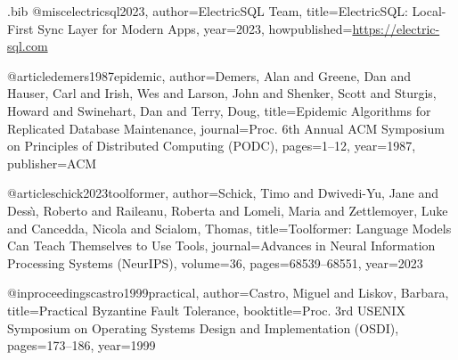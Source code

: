 \begin{filecontents*}{\jobname.bib}
@misc{electricsql2023,
  author={{ElectricSQL Team}},
  title={{ElectricSQL}: Local-First Sync Layer for Modern Apps},
  year={2023},
  howpublished={\url{https://electric-sql.com}}
}

@article{demers1987epidemic,
  author={Demers, Alan and Greene, Dan and Hauser, Carl and Irish, Wes and Larson, John and Shenker, Scott and Sturgis, Howard and Swinehart, Dan and Terry, Doug},
  title={Epidemic Algorithms for Replicated Database Maintenance},
  journal={Proc. 6th Annual ACM Symposium on Principles of Distributed Computing (PODC)},
  pages={1--12},
  year={1987},
  publisher={ACM}
}

@article{schick2023toolformer,
  author={Schick, Timo and Dwivedi-Yu, Jane and Dess\`{\i}, Roberto and Raileanu, Roberta and Lomeli, Maria and Zettlemoyer, Luke and Cancedda, Nicola and Scialom, Thomas},
  title={Toolformer: Language Models Can Teach Themselves to Use Tools},
  journal={Advances in Neural Information Processing Systems (NeurIPS)},
  volume={36},
  pages={68539--68551},
  year={2023}
}

@inproceedings{castro1999practical,
  author={Castro, Miguel and Liskov, Barbara},
  title={Practical {Byzantine} Fault Tolerance},
  booktitle={Proc. 3rd USENIX Symposium on Operating Systems Design and Implementation (OSDI)},
  pages={173--186},
  year={1999}
}

\end{filecontents*}

\documentclass[conference]{IEEEtran}

\usepackage{cite}
\usepackage{amsmath,amssymb,amsfonts,amsthm}
\usepackage{algorithmicx}
\usepackage{algorithm}
\usepackage{algpseudocode}
\usepackage{graphicx}
\usepackage{textcomp}
\usepackage{xcolor}
\usepackage{listings}
\usepackage{booktabs}
\usepackage{array}
\usepackage{url}
\usepackage[hidelinks]{hyperref}
\usepackage{microtype}
\usepackage{balance}
\renewcommand{\topfraction}{0.95}
\renewcommand{\bottomfraction}{0.85}
\renewcommand{\textfraction}{0.05}
\renewcommand{\floatpagefraction}{0.85}
\renewcommand{\dbltopfraction}{0.95}
\renewcommand{\dblfloatpagefraction}{0.85}
\setcounter{topnumber}{5}
\setcounter{bottomnumber}{4}
\setcounter{totalnumber}{8}
\setcounter{dbltopnumber}{4}
\usepackage{tikz}
\usepackage{pgfplots}
\pgfplotsset{compat=1.18}
\usetikzlibrary{arrows.meta,positioning,shapes.geometric,calc,fit,backgrounds,patterns}

